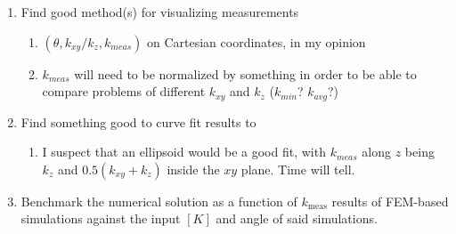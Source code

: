 \documentclass[10pt, letterpaper]{article}
\begin{document}
\begin{enumerate}
\begin{enumerate}
\begin{enumerate}
            \end{enumerate}
            \item Find good method(s) for visualizing measurements
            \begin{enumerate}
                \item \((\theta, k_{xy}/k_z, k_{meas})\) on Cartesian coordinates, in my opinion
                \item \(k_{meas}\) will need to be normalized by something in order to be able to compare problems of different \(k_{xy}\) and \(k_z\) (\(k_{min}\)? \(k_{avg}\)?)
            \end{enumerate}
            \item Find something good to curve fit results to
            \begin{enumerate}
                \item I suspect that an ellipsoid would be a good fit, with \(k_{meas}\) along \(z\) being \(k_z\) and \(0.5(k_{xy}+k_z)\) inside the \(xy\) plane. Time will tell.
            \end{enumerate}
            \item Benchmark the numerical solution as a function of \(k_\textrm{meas}\) results of FEM-based simulations against the input \([K]\) and angle of said simulations.
        \end{enumerate}


\end{enumerate}
\end{document}
